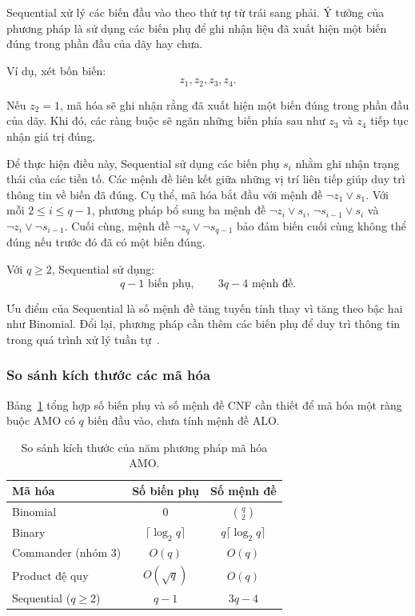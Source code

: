 \documentclass[a4paper,fleqn]{cas-sc}
\begin{document}
Sequential xử lý các biến đầu vào theo thứ tự từ trái sang phải. Ý tưởng của phương pháp là sử dụng các biến phụ để ghi nhận liệu đã xuất hiện một biến đúng trong phần đầu của dãy hay chưa.

Ví dụ, xét bốn biến:
\[
z_1,z_2,z_3,z_4.
\]

Nếu $z_2=1$, mã hóa sẽ ghi nhận rằng đã xuất hiện một biến đúng trong phần đầu của dãy. Khi đó, các ràng buộc sẽ ngăn những biến phía sau như $z_3$ và $z_4$ tiếp tục nhận giá trị đúng.

Để thực hiện điều này, Sequential sử dụng các biến phụ $s_i$ nhằm ghi nhận trạng thái của các tiền tố. Các mệnh đề liên kết giữa những vị trí liên tiếp giúp duy trì thông tin về biến đã đúng. Cụ thể, mã hóa bắt đầu với mệnh đề $\neg z_1\lor s_1$. Với mỗi $2\leq i\leq q-1$, phương pháp bổ sung ba mệnh đề $\neg z_i\lor s_i$, $\neg s_{i-1}\lor s_i$ và $\neg z_i\lor\neg s_{i-1}$. Cuối cùng, mệnh đề $\neg z_q\lor\neg s_{q-1}$ bảo đảm biến cuối cùng không thể đúng nếu trước đó đã có một biến đúng.

Với $q\geq2$, Sequential sử dụng:
\[
q-1\text{ biến phụ},\qquad 3q-4\text{ mệnh đề}.
\]

Ưu điểm của Sequential là số mệnh đề tăng tuyến tính thay vì tăng theo bậc hai như Binomial. Đổi lại, phương pháp cần thêm các biến phụ để duy trì thông tin trong quá trình xử lý tuần tự~\cite{sinz}.

\subsubsection{So sánh kích thước các mã hóa}

Bảng~\ref{tab:amo-theory} tổng hợp số biến phụ và số mệnh đề CNF cần thiết để mã hóa một ràng buộc AMO có $q$ biến đầu vào, chưa tính mệnh đề ALO.

\begin{table}[pos=H]
\centering
\caption{So sánh kích thước của năm phương pháp mã hóa AMO.}
\label{tab:amo-theory}
\small
\begin{tabular}{lcc}
\toprule
\textbf{Mã hóa} & \textbf{Số biến phụ} & \textbf{Số mệnh đề} \\
\midrule
Binomial & $0$ & $\binom{q}{2}$ \\
Binary & $\lceil\log_2q\rceil$ & $q\lceil\log_2q\rceil$ \\
Commander (nhóm 3) & $O(q)$ & $O(q)$ \\
Product đệ quy & $O(\sqrt q)$ & $O(q)$ \\
Sequential ($q\geq2$) & $q-1$ & $3q-4$ \\
\bottomrule
\end{tabular}
\end{table}
\end{document}
